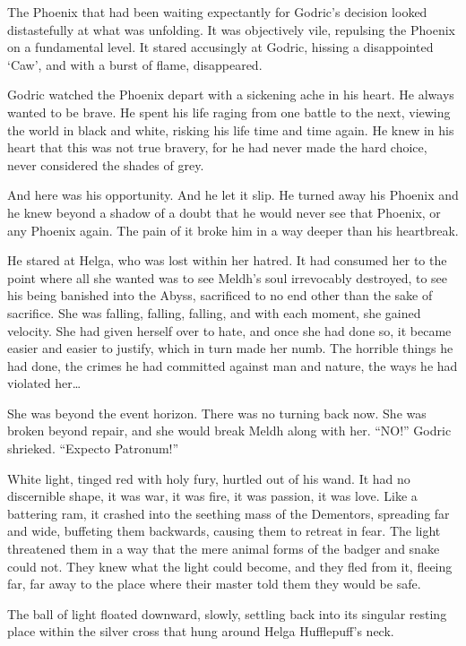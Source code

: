 The Phoenix that had been waiting expectantly for Godric’s decision looked distastefully at what was unfolding. It was objectively vile, repulsing the Phoenix on a fundamental level. It stared accusingly at Godric, hissing a disappointed ‘Caw’, and with a burst of flame, disappeared.

Godric watched the Phoenix depart with a sickening ache in his heart. He always wanted to be brave. He spent his life raging from one battle to the next, viewing the world in black and white, risking his life time and time again. He knew in his heart that this was not true bravery, for he had never made the hard choice, never considered the shades of grey.

And here was his opportunity. And he let it slip. He turned away his Phoenix and he knew beyond a shadow of a doubt that he would never see that Phoenix, or any Phoenix again. The pain of it broke him in a way deeper than his heartbreak.

He stared at Helga, who was lost within her hatred. It had consumed her to the point where all she wanted was to see Meldh’s soul irrevocably destroyed, to see his being banished into the Abyss, sacrificed to no end other than the sake of sacrifice. She was falling, falling, falling, and with each moment, she gained velocity. She had given herself over to hate, and once she had done so, it became easier and easier to justify, which in turn made her numb. The horrible things he had done, the crimes he had committed against man and nature, the ways he had violated her…

She was beyond the event horizon. There was no turning back now. She was broken beyond repair, and she would break Meldh along with her.
“NO!” Godric shrieked. “Expecto Patronum!”

White light, tinged red with holy fury, hurtled out of his wand. It had no discernible shape, it was war, it was fire, it was passion, it was love. Like a battering ram, it crashed into the seething mass of the Dementors, spreading far and wide, buffeting them backwards, causing them to retreat in fear. The light threatened them in a way that the mere animal forms of the badger and snake could not. They knew what the light could become, and they fled from it, fleeing far, far away to the place where their master told them they would be safe.

The ball of light floated downward, slowly, settling back into its singular resting place within the silver cross that hung around Helga Hufflepuff’s neck.

